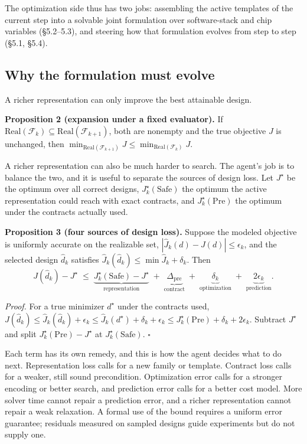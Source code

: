 \documentclass[11pt]{article}
\begin{document}
The optimization side thus has two jobs: assembling the active templates of the current step into a solvable joint formulation over software-stack and chip variables (§5.2--5.3), and steering how that formulation evolves from step to step (§5.1, §5.4).

\hypertarget{why-the-formulation-must-evolve}{%
\subsection{Why the formulation must evolve}\label{why-the-formulation-must-evolve}}

A richer representation can only improve the best attainable design.

\textbf{Proposition 2 (expansion under a fixed evaluator).} If \(\mathrm{Real}(\mathcal F_k)\subseteq\mathrm{Real}(\mathcal F_{k+1})\), both are nonempty and the true objective \(J\) is unchanged, then \(\min_{\mathrm{Real}(\mathcal F_{k+1})}J\le\min_{\mathrm{Real}(\mathcal F_k)}J\).

A richer representation can also be much harder to search. The agent's job is to balance the two, and it is useful to separate the sources of design loss. Let \(J^\star\) be the optimum over all correct designs, \(J^\star_k(\mathrm{Safe})\) the optimum the active representation could reach with exact contracts, and \(J^\star_k(\mathrm{Pre})\) the optimum under the contracts actually used.

\textbf{Proposition 3 (four sources of design loss).} Suppose the modeled objective is uniformly accurate on the realizable set, \(|\hat J_k(d)-J(d)|\le\epsilon_k\), and the selected design \(\hat d_k\) satisfies \(\hat J_k(\hat d_k)\le\min\hat J_k+\delta_k\). Then
\[
J(\hat d_k)-J^\star\;\le\;\underbrace{J^\star_k(\mathrm{Safe})-J^\star}_{\text{representation}}\;+\;\underbrace{\Delta_{\mathrm{pre}}}_{\text{contract}}\;+\;\underbrace{\delta_k}_{\text{optimization}}\;+\;\underbrace{2\epsilon_k}_{\text{prediction}}.
\]

\emph{Proof.} For a true minimizer \(d^\star\) under the contracts used, \(J(\hat d_k)\le\hat J_k(\hat d_k)+\epsilon_k\le\hat J_k(d^\star)+\delta_k+\epsilon_k\le J^\star_k(\mathrm{Pre})+\delta_k+2\epsilon_k\). Subtract \(J^\star\) and split \(J^\star_k(\mathrm{Pre})-J^\star\) at \(J^\star_k(\mathrm{Safe})\). \(\square\)

Each term has its own remedy, and this is how the agent decides what to do next. Representation loss calls for a new family or template. Contract loss calls for a weaker, still sound precondition. Optimization error calls for a stronger encoding or better search, and prediction error calls for a better cost model. More solver time cannot repair a prediction error, and a richer representation cannot repair a weak relaxation. A formal use of the bound requires a uniform error guarantee; residuals measured on sampled designs guide experiments but do not supply one.
\end{document}
